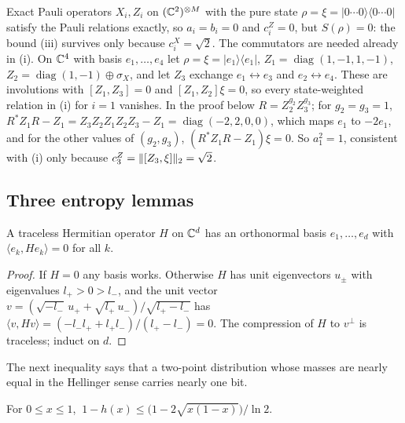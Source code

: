 \begin{example}\label{ex:commutators-needed}
Exact Pauli operators $X_i,Z_i$ on $(\mathbb C^2)^{\otimes M}$ with the pure state $\rho=\xi=|0\cdots0\rangle\langle0\cdots0|$ satisfy the
Pauli relations exactly, so $a_i=b_i=0$ and $c^Z_i=0$, but $S(\rho)=0$: the bound (iii) survives only because $c^X_i=\sqrt2$. The
commutators are needed already in (i). On $\mathbb C^4$ with basis $e_1,\dots,e_4$ let $\rho=\xi=|e_1\rangle\langle e_1|$,
$Z_1=\operatorname{diag}(1,-1,1,-1)$, $Z_2=\operatorname{diag}(1,-1)\oplus\sigma_X$, and let $Z_3$ exchange $e_1\leftrightarrow e_3$ and
$e_2\leftrightarrow e_4$. These are involutions with $[Z_1,Z_3]=0$ and $[Z_1,Z_2]\xi=0$, so every state-weighted relation in (i) for $i=1$
vanishes. In the proof below $R=Z_2^{g_2}Z_3^{g_3}$; for $g_2=g_3=1$, $R^*Z_1R-Z_1=Z_3Z_2Z_1Z_2Z_3-Z_1=\operatorname{diag}(-2,2,0,0)$,
which maps $e_1$ to $-2e_1$, and for the other values of $(g_2,g_3)$, $(R^*Z_1R-Z_1)\xi=0$. So $a_1^2=1$, consistent with (i) only because
$c^Z_3=\lVert [Z_3,\xi]\rVert_2=\sqrt2$.
\end{example}

\subsection{Three entropy lemmas}

\begin{lemma}\label{lem:zero-diagonal}
A traceless Hermitian operator $H$ on $\mathbb C^d$ has an orthonormal basis $e_1,\dots,e_d$ with $\langle e_k,He_k\rangle=0$ for all $k$.
\end{lemma}

\begin{proof}
If $H=0$ any basis works. Otherwise $H$ has unit eigenvectors $u_\pm$ with eigenvalues $l_+>0>l_-$, and the unit vector
$v=(\sqrt{-l_-}\,u_++\sqrt{l_+}\,u_-)/\sqrt{l_+-l_-}$ has $\langle v,Hv\rangle=(-l_-l_++l_+l_-)/(l_+-l_-)=0$. The compression of $H$ to
$v^\perp$ is traceless; induct on $d$.
\end{proof}

The next inequality says that a two-point distribution whose masses are nearly equal in the Hellinger sense carries nearly one bit.

\begin{lemma}\label{lem:hellinger}
For $0\le x\le1$, $\ 1-h(x)\le\bigl(1-2\sqrt{x(1-x)}\bigr)/\ln2$.
\end{lemma}

